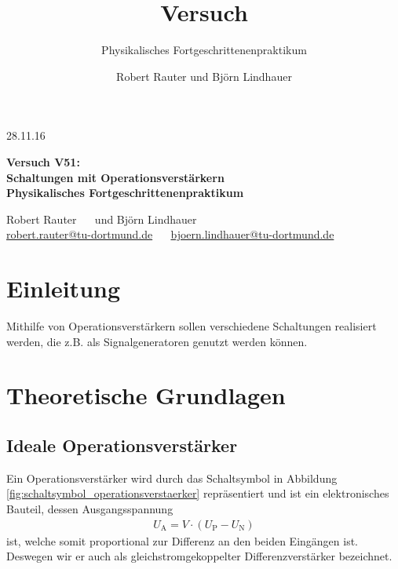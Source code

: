 \documentclass[]{scrartcl}
\title{Versuch \versuchnummer\\ \versuchname}
\subtitle{Physikalisches Fortgeschrittenenpraktikum}
\author{Robert Rauter und Björn Lindhauer}
\date{\versuchdatum}
\newcommand{\versuchnummer}{V51}
\newcommand{\versuchname}{Schaltungen mit Operationsverstärkern}
\newcommand{\versuchdatum}{28.11.16}
\let\oldsection\section
\renewcommand\section{\clearpage\oldsection}
\begin{document}
\begin{titlepage}
{\large \versuchdatum}
\vspace{7cm}
\begin{center}
\textbf{\huge Versuch \versuchnummer:}\\
\vspace{0.5cm}
\textbf{\huge \versuchname}\\
\vspace{0.2cm}
\textbf{ Physikalisches Fortgeschrittenenpraktikum}\\
\vspace{9cm}

{\Large Robert Rauter \ \ \hspace{1.5cm} und \hspace{1.5cm} Björn Lindhauer}\\
{ \url{robert.rauter@tu-dortmund.de} \ \ \hspace{2cm} \url{bjoern.lindhauer@tu-dortmund.de}}
\end{center}
\end{titlepage}

\tableofcontents

\section{Einleitung}
Mithilfe von Operationsverstärkern sollen verschiedene Schaltungen realisiert werden, die z.B. als Signalgeneratoren genutzt werden können.

\section{Theoretische Grundlagen}
\subsection{Ideale Operationsverstärker}
Ein Operationsverstärker wird durch das Schaltsymbol in Abbildung  \ref{fig:schaltsymbol_operationsverstaerker} repräsentiert und ist ein elektronisches Bauteil, dessen Ausgangsspannung
\begin{align}
 U_{\text{A}}=V\cdot \left( U_{\text{P}}-U_{\text{N}} \right)
\end{align}
ist, welche somit proportional zur Differenz an den beiden Eingängen ist.
Deswegen wir er auch als gleichstromgekoppelter Differenzverstärker bezeichnet.
\end{document}
